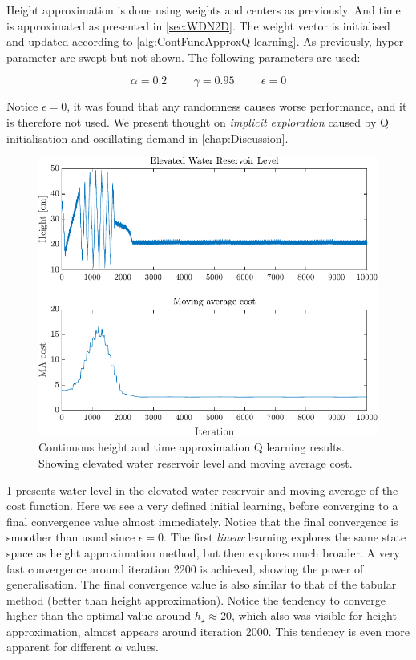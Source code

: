 Height approximation is done using weights and centers as previously. And time is approximated as presented in \cref{sec:WDN2D}. The weight vector is initialised and updated according to \cref{alg:ContFuncApproxQ-learning}. As previously, hyper parameter are swept but not shown. The following parameters are used:

\begin{equation*}
	\alpha = 0.2 \hspace{1cm} \gamma = 0.95 \hspace{1cm} \epsilon = 0
\end{equation*}

Notice $\epsilon = 0$, it was found that any randomness causes worse performance, and it is therefore not used. We present thought on \textit{implicit exploration} caused by Q initialisation and oscillating demand in \cref{chap:Discussion}.

\begin{figure}[h!]
	\centering
	\includegraphics[width=0.7\linewidth]{figures/DoubleContResults1.pdf}
	\caption{Continuous height and time approximation Q learning results. Showing elevated water reservoir level and moving average cost.}
	\label{fig:DoubleContResults1}
\end{figure} 

\cref{fig:DoubleContResults1} presents water level in the elevated water reservoir and moving average of the cost function. Here we see a very defined initial learning, before converging to a final convergence value almost immediately. Notice that the final convergence is smoother than usual since $\epsilon = 0$. The first \textit{linear} learning explores the same state space as height approximation method, but then explores much broader. A very fast convergence around iteration 2200 is achieved, showing the power of generalisation. The final convergence value is also similar to that of the tabular method (better than height approximation). Notice the tendency to converge higher than the optimal value around $h_\star \approx 20$, which also was visible for height approximation, almost appears around iteration  2000. This tendency is even more apparent for different $\alpha$ values.

